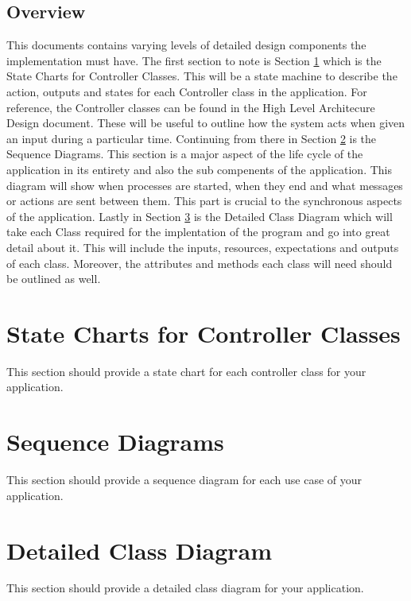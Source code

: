 \documentclass[]{article}
\begin{document}
\subsection{Overview}
\label{sub:overview}

This documents contains varying levels of detailed design components the implementation must have. The first section to note is Section \ref{sec:state_charts_for_controller_classes} which is the State Charts for Controller Classes. This will be a state machine to describe the action, outputs and states for each Controller class in the application. For reference, the Controller classes can be found in the High Level Architecure Design document. These will be useful to outline how the system acts when given an input during a particular time. Continuing from there in Section \ref{sec:sequence_diagrams} is the Sequence Diagrams. This section is a major aspect of the life cycle of the application in its entirety and also the sub compenents of the application. This diagram will show when processes are started, when they end and what messages or actions are sent between them. This part is crucial to the synchronous aspects of the application. Lastly in Section \ref{sec:detailed_class_diagram} is the Detailed Class Diagram which will take each Class required for the implentation of the program and go into great detail about it. This will include the inputs, resources, expectations and outputs of each class. Moreover, the attributes and methods each class will need should be outlined as well.

\section{State Charts for Controller Classes}
\label{sec:state_charts_for_controller_classes}
This section should provide a state chart for each controller class for your application.

\section{Sequence Diagrams}
\label{sec:sequence_diagrams}
This section should provide a sequence diagram for each use case of your application.

\section{Detailed Class Diagram}
\label{sec:detailed_class_diagram}
This section should provide a detailed class diagram for your application.
\end{document}
